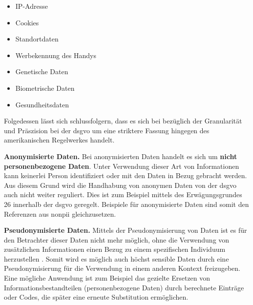\begin{itemize}
	\item IP-Adresse
	\item Cookies
	\item Standortdaten
	\item Werbekennung des Handys
	\item Genetische Daten
	\item Biometrische Daten
	\item Gesundheitsdaten
\end{itemize}

\noindent Folgedessen lässt sich schlussfolgern, dass es sich bei bezüglich der Granularität und Präszision bei der \ac{dsgvo} um eine striktere Fassung hingegen des amerikanischen Regelwerkes handelt.


\noindent \textbf{Anonymisierte Daten.}
Bei anonymisierten Daten handelt es sich um \textbf{nicht personenbezogene Daten}. Unter Verwendung dieser Art von Informationen kann keinerlei Person identifiziert oder mit den Daten in Bezug gebracht werden. Aus diesem Grund wird die Handhabung von anonymen Daten von der \ac{dsgvo} auch nicht weiter reguliert. Dies ist zum Beispiel mittels des Erwägungsgrundes 26 \cite{DSGVOEg26} innerhalb der \ac{dsgvo} geregelt. Beispiele für anonymisierte Daten sind somit den Referenzen aus \ac{nonpii} gleichzusetzen.


\noindent \textbf{Pseudonymisierte Daten.}
Mittels der Pseudonymisierung von Daten ist es für den Betrachter dieser Daten nicht mehr möglich, ohne die Verwendung von zusätzlichen Informationen einen Bezug zu einem spezifischen Individuum herzustellen \cite{DSGVOArt4}. Somit wird es möglich auch höchst sensible Daten durch eine Pseudonymisierung für die Verwendung in einem anderen Kontext freizugeben. Eine mögliche Anwendung ist zum Beispiel das gezielte Ersetzen von Informationsbestandteilen (personenbezogene Daten) durch berechnete Einträge oder Codes, die später eine erneute Substitution ermöglichen.

